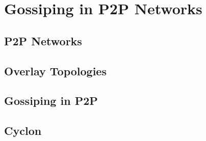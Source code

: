 \chapter{Gossiping in P2P Networks} 
\label{chap:gossiping}


\section{P2P Networks}

\section{Overlay Topologies}

\section{Gossiping in P2P}

\section{Cyclon} 
